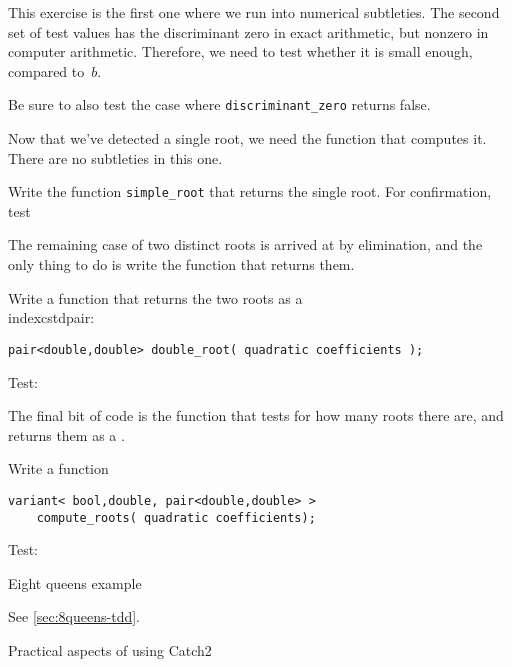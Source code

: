 This exercise is the first one where we run into
numerical subtleties.
The second set of test values has the discriminant zero
in exact arithmetic, but nonzero in computer arithmetic.
Therefore, we need to test whether it is small enough, compared to~$b$.

\begin{exercise}
  Be sure to also test the case where \lstinline+discriminant_zero+
  returns false.
\end{exercise}

Now that we've detected a single root, we need the function
that computes it. There are no subtleties in this one.

\begin{exercise}
  \label{ex:qtestsimple}
  Write the function \lstinline+simple_root+ that returns
  the single root.
  For confirmation, test
\end{exercise}

The remaining case of two distinct roots is arrived at
by elimination, and the only thing to do is write
the function that returns them.

\begin{exercise}
  \label{ex:qtestdouble}
  Write a function that returns the two roots
  as a \\indexcstd{pair}:
\begin{lstlisting}
pair<double,double> double_root( quadratic coefficients );
\end{lstlisting}
Test:
\end{exercise}

The final bit of code is the function that
tests for how many roots there are, and returns them
as a .

\begin{exercise}
  \label{ex:qtestfull}
  Write a function
\begin{lstlisting}
variant< bool,double, pair<double,double> > 
    compute_roots( quadratic coefficients);
\end{lstlisting}
Test:
\begin{multicols}{2}
\end{multicols}
\end{exercise}


 {Eight queens example}

See \ref{sec:8queens-tdd}.

 {Practical aspects of using Catch2}
\label{sec:catch2use}

